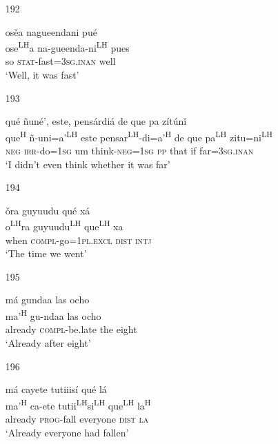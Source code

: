 \begin{itemize}
\item[192]
 
\glll   os\v{e}a nagueendani pu\'{e}  \\
ose\textsuperscript{LH}a na-gueenda-ni\textsuperscript{LH} pues \\
so \textsc{stat}-fast=\textsc{3sg.inan} well \\
\glt `Well, it was fast'
 


\item[193]
 
\glll   qu\'{e} \~{n}un\'{e}', este, pens\'{a}rdi\'{a} de que pa z\'{i}t\'{u}n\v{i} \\
que\textsuperscript{H} \~{n}-uni=a'\textsuperscript{LH} este pensar\textsuperscript{LH}-di=a'\textsuperscript{H} de que pa\textsuperscript{LH} zitu=ni\textsuperscript{LH} \\
\textsc{neg} \textsc{irr}-do=\textsc{1sg} um think-\textsc{neg}=\textsc{1sg} \textsc{pp} that if far=\textsc{3sg.inan} \\
\glt `I didn't even think whether it was far'
 


\item[194]
 
\glll   \v{o}ra guyuudu qu\'{e} x\'{a}  \\
   o\textsuperscript{LH}ra guyuudu\textsuperscript{LH} que\textsuperscript{LH} xa \\
when \textsc{compl}-go=\textsc{1pl.excl} \textsc{dist} \textsc{intj} \\
\glt `The time we went'
 


\item[195]
 
\glll   m\'{a} gundaa las ocho  \\
  ma'\textsuperscript{H} gu-ndaa las ocho \\
already \textsc{compl}-be.late the eight \\
\glt `Already after eight'
 


\item[196]
 
\glll   m\'{a} cayete tutiiis\'{i} qu\'{e} l\'{a}  \\
ma'\textsuperscript{H} ca-ete tutii\textsuperscript{LH}si\textsuperscript{LH} que\textsuperscript{LH} la\textsuperscript{H} \\
already \textsc{prog}-fall everyone \textsc{dist} \textsc{la} \\
\glt `Already everyone had fallen'
 



\end{itemize}
